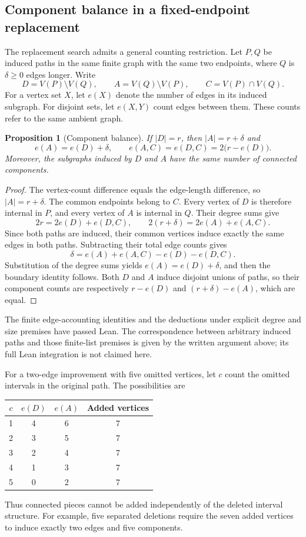 \documentclass[11pt,a4paper]{article}
\newtheorem{proposition}[theorem]{Proposition}
\theoremstyle{definition}
\theoremstyle{remark}
\begin{document}
\subsection{Component balance in a fixed-endpoint replacement}
\label{sec:exchange-balance}
The replacement search admits a general counting restriction. Let $P,Q$
be induced paths in the same finite graph with the same two endpoints,
where $Q$ is $\delta\ge0$ edges longer. Write
\[
D=V(P)\setminus V(Q),\qquad A=V(Q)\setminus V(P),
\qquad C=V(P)\cap V(Q).
\]
For a vertex set $X$, let $e(X)$ denote the number of edges in its
induced subgraph. For disjoint sets, let $e(X,Y)$ count edges between
them. These counts refer to the same ambient graph.

\begin{proposition}[Component balance]
If $|D|=r$, then $|A|=r+\delta$ and
\[
\boxed{e(A)=e(D)+\delta,\qquad
e(A,C)=e(D,C)=2\bigl(r-e(D)\bigr).}
\]
Moreover, the subgraphs induced by $D$ and $A$ have the same number
of connected components.
\end{proposition}
\begin{proof}
The vertex-count difference equals the edge-length difference, so
$|A|=r+\delta$. The common endpoints belong to $C$. Every vertex of
$D$ is therefore internal in $P$, and every vertex of $A$ is internal
in $Q$. Their degree sums give
\[
2r=2e(D)+e(D,C),\qquad
2(r+\delta)=2e(A)+e(A,C).
\]
Since both paths are induced, their common vertices induce exactly
the same edges in both paths. Subtracting their total edge counts gives
\[
\delta=e(A)+e(A,C)-e(D)-e(D,C).
\]
Substitution of the degree sums yields $e(A)=e(D)+\delta$, and then
the boundary identity follows. Both $D$ and $A$ induce disjoint unions
of paths, so their component counts are respectively
$r-e(D)$ and $(r+\delta)-e(A)$, which are equal.
\end{proof}
The finite edge-accounting identities and the deductions under explicit
degree and size premises have passed Lean. The correspondence between
arbitrary induced paths and those finite-list premises is given by the
written argument above; its full Lean integration is not claimed here.

For a two-edge improvement with five omitted vertices, let $c$ count
the omitted intervals in the original path. The possibilities are
\begin{center}
\begin{tabular}{cccc}
\toprule
$c$ & $e(D)$ & $e(A)$ & Added vertices\\
\midrule
1 & 4 & 6 & 7\\
2 & 3 & 5 & 7\\
3 & 2 & 4 & 7\\
4 & 1 & 3 & 7\\
5 & 0 & 2 & 7\\
\bottomrule
\end{tabular}
\end{center}
Thus connected pieces cannot be added independently of the deleted
interval structure. For example, five separated deletions require the
seven added vertices to induce exactly two edges and five components.
\end{document}
